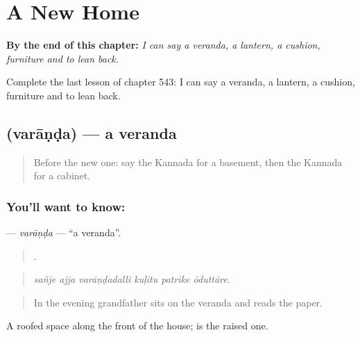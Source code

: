 
\chapter{A New Home}
\label{ch:ka-a-new-home}

\begin{chapteropening}
\textbf{By the end of this chapter:} \emph{I can say a veranda, a lantern, a cushion, furniture and to lean back.}

Complete the last lesson of chapter 543: I can say a veranda, a lantern, a cushion, furniture and to lean back.
\end{chapteropening}

\section[\texorpdfstring{\kn{ವರಾಂಡ} (varāṇḍa)}{ವರಾಂಡ (varāṇḍa)}]{ (varāṇḍa) — a veranda}

\label{lesson:KA-C543-varanda}



\begin{quote}
Before the new one: say the Kannada for a basement, then the Kannada for a cabinet.
\end{quote}

\subsection*{You'll want to know: }
\textbf{} — \emph{varāṇḍa} — \textquotedblleft{}a veranda\textquotedblright{}.

\begin{quote}
     .
\end{quote}

\begin{quote}
\emph{sañje ajja varāṇḍadalli kuḷitu patrike ōduttāre.}
\end{quote}

\begin{quote}
In the evening grandfather sits on the veranda and reads the paper.
\end{quote}

A roofed space along the front of the house;  is the raised one.

